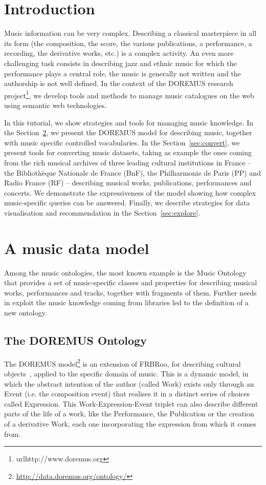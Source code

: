 \section{Introduction}
Music information can be very complex. Describing a classical masterpiece in all its form (the composition, the score, the various publications, a performance, a recording, the derivative works, etc.) is a complex activity. An even more challenging task consists in describing jazz and ethnic music for which the performance plays a central role, the music is generally not written and the authorship is not well defined. In the context of the DOREMUS research project\footnote{url{http://www.doremus.org}}, we develop tools and methods to manage music catalogues on the web using semantic web technologies. 

In this tutorial, we show strategies and tools for managing music knowledge. In the Section~\ref{sec:model}, we present the DOREMUS model for describing music, together with music specific controlled vocabularies. In the Section~\ref{sec:convert}, we present tools for converting music datasets, taking as example the ones coming from the rich musical archives of three leading cultural institutions in France -- the Biblioth\`eque Nationale de France (BnF), the Philharmonie de Paris (PP) and Radio France (RF) -- describing musical works, publications, performances and concerts. We demonstrate the expressiveness of the model showing  how complex music-specific queries can be answered. Finally, we describe strategies for data visualisation and recommendation in the Section~\ref{sec:explore}.

\section{A music data model}\label{sec:model}
Among the music ontologies, the most known example is the Music Ontology~\cite{raimond2007music} that provides a set of music-specific classes and properties for describing musical works, performances and tracks, together with fragments of them. Further needs in exploit the music knowledge coming from libraries led to the definition of a new ontology.

\subsection{The DOREMUS Ontology}
The DOREMUS model\footnote{\url{http://data.doremus.org/ontology/}} is an extension of FRBRoo, for describing cultural objects~\cite{doerr2008frbroo}, applied to the specific domain of music. This is a dynamic model, in which the abstract intention of the author (called Work) exists only through an Event (i.e. the composition event) that realises it in a distinct series of choices called Expression. This Work-Expression-Event triplet can also describe different parts of the life of a work, like the Performance, the Publication or the creation of a derivative Work, each one incorporating the expression from which it comes from.

